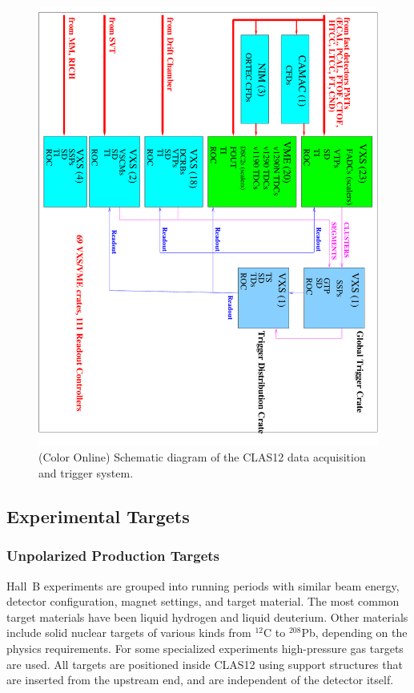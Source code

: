 \documentclass[final,3p,twocolumn]{elsarticle}
\begin{document}
\begin{figure}[htbp!]
\centerline{\includegraphics[angle=90,width=1.5\columnwidth]{clas12-daq-1.pdf}}
\caption{(Color Online) Schematic diagram of the CLAS12 data acquisition and trigger system.}
\label{daq}
\end{figure}

\subsection{Experimental Targets}

\subsubsection{Unpolarized Production Targets} 

Hall~B experiments are grouped into running periods with similar beam energy, detector configuration, magnet
settings, and target material. The most common target materials have been liquid hydrogen and liquid deuterium.
Other materials include solid nuclear targets of various kinds from $^{12}$C to $^{208}$Pb, depending on the physics
requirements. For some specialized experiments high-pressure gas targets are used. All targets are positioned
inside CLAS12 using support structures that are inserted from the upstream end, and are independent of the
detector itself. 
\end{document}
